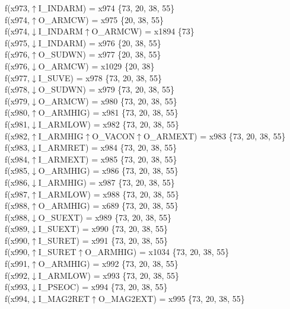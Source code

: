 f(x973,$\uparrow$I\_INDARM) = x974 \{73, 20, 38, 55\} \\  
f(x974,$\uparrow$O\_ARMCW) = x975 \{20, 38, 55\} \\  
f(x974,$\downarrow$I\_INDARM$\uparrow$O\_ARMCW) = x1894 \{73\} \\  
f(x975,$\downarrow$I\_INDARM) = x976 \{20, 38, 55\} \\  
f(x976,$\uparrow$O\_SUDWN) = x977 \{20, 38, 55\} \\  
f(x976,$\downarrow$O\_ARMCW) = x1029 \{20, 38\} \\  
f(x977,$\downarrow$I\_SUVE) = x978 \{73, 20, 38, 55\} \\  
f(x978,$\downarrow$O\_SUDWN) = x979 \{73, 20, 38, 55\} \\  
f(x979,$\downarrow$O\_ARMCW) = x980 \{73, 20, 38, 55\} \\  
f(x980,$\uparrow$O\_ARMHIG) = x981 \{73, 20, 38, 55\} \\  
f(x981,$\downarrow$I\_ARMLOW) = x982 \{73, 20, 38, 55\} \\  
f(x982,$\uparrow$I\_ARMHIG$\uparrow$O\_VACON$\uparrow$O\_ARMEXT) = x983 \{73, 20, 38, 55\} \\  
f(x983,$\downarrow$I\_ARMRET) = x984 \{73, 20, 38, 55\} \\  
f(x984,$\uparrow$I\_ARMEXT) = x985 \{73, 20, 38, 55\} \\  
f(x985,$\downarrow$O\_ARMHIG) = x986 \{73, 20, 38, 55\} \\  
f(x986,$\downarrow$I\_ARMHIG) = x987 \{73, 20, 38, 55\} \\  
f(x987,$\uparrow$I\_ARMLOW) = x988 \{73, 20, 38, 55\} \\  
f(x988,$\uparrow$O\_ARMHIG) = x689 \{73, 20, 38, 55\} \\  
f(x988,$\downarrow$O\_SUEXT) = x989 \{73, 20, 38, 55\} \\  
f(x989,$\downarrow$I\_SUEXT) = x990 \{73, 20, 38, 55\} \\  
f(x990,$\uparrow$I\_SURET) = x991 \{73, 20, 38, 55\} \\  
f(x990,$\uparrow$I\_SURET$\uparrow$O\_ARMHIG) = x1034 \{73, 20, 38, 55\} \\  
f(x991,$\uparrow$O\_ARMHIG) = x992 \{73, 20, 38, 55\} \\  
f(x992,$\downarrow$I\_ARMLOW) = x993 \{73, 20, 38, 55\} \\  
f(x993,$\downarrow$I\_PSEOC) = x994 \{73, 20, 38, 55\} \\  
f(x994,$\downarrow$I\_MAG2RET$\uparrow$O\_MAG2EXT) = x995 \{73, 20, 38, 55\} \\  
